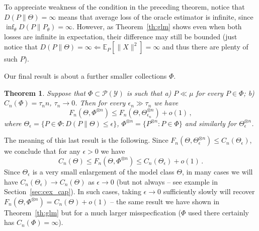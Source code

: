 \documentclass[12pt]{colt2021} %
\newtheorem{theorem}{Theorem}[section]
\theoremstyle{remark}
\def\EE{\Expect}
\newcommand{\Expect}{\mathbb{E}}
\newcommand{\calP}{{\mathcal{P}}}
\newcommand{\calY}{{\mathcal{Y}}}
\begin{document}
To appreciate weakness of the condition in the preceding theorem, notice that $D(P\|\Theta)=\infty$ means that average
loss of the oracle estimator is infinite, since $\inf_\theta D(P\|P_\theta)=\infty$. However, as Theorem~\ref{th:glm}
shows even when both losses are infinite in expectation, their difference may still be bounded (just notice that
$D(P\|\Theta)=\infty \Leftarrow \EE_{P} [\|X\|^2] = \infty$ and thus there are plenty of such $P$).

\smallskip
Our final result is about a further smaller collections $\Phi$. 
\begin{theorem}\label{th:small} Suppose that $\Phi \subset \calP(\calY)$ is such that a) $P\ll \mu$ for every $P\in
\Phi$; b) $C_n(\Phi) = \tau_n n$, $\tau_n\to 0$. Then for every $\epsilon_n \gg \tau_n$ we have 
	$$ F_n(\Theta, \Phi^{\otimes n}) \le F_n(\Theta, \Theta_{\epsilon_n}^{\otimes n}) + o(1)\,,$$
where $\Theta_\epsilon = \{P \in \Phi: D(P\|\Theta) \le \epsilon\}$, $\Phi^{\otimes n} = \{P^{\otimes n}: P \in \Phi\}$
and similarly for $\Theta_{\epsilon}^{\otimes n}$.
\end{theorem}

The meaning of this last result is the following. Since $F_n(\Theta, \Theta_{\epsilon}^{\otimes n}) \le C_n(\Theta_\epsilon)$, we
conclude that for any $\epsilon>0$ we have
	\begin{equation}\label{eq:small_disc}
		C_n(\Theta) \le F_n(\Theta, \Phi^{\otimes n}) \le C_n(\Theta_\epsilon) + o(1)\,.
\end{equation}	
Since $\Theta_\epsilon$ is a very small enlargement of the model class $\Theta$, in many cases we will have
$C_n(\Theta_\epsilon) \to C_n(\Theta)$ as $\epsilon\to 0$ (but not always -- see example in Section~\ref{sec:cex_cap}). 
In such cases, taking $\epsilon\to 0$ sufficiently slowly
will recover $F_n(\Theta,\Phi^{\otimes n}) = C_n(\Theta) + o(1)$ -- the same result we have shown in
Theorem~\ref{th:glm} but for a much larger misspecfication ($\Phi$ used there certainly has $C_n(\Phi)=\infty$). 
\end{document}
